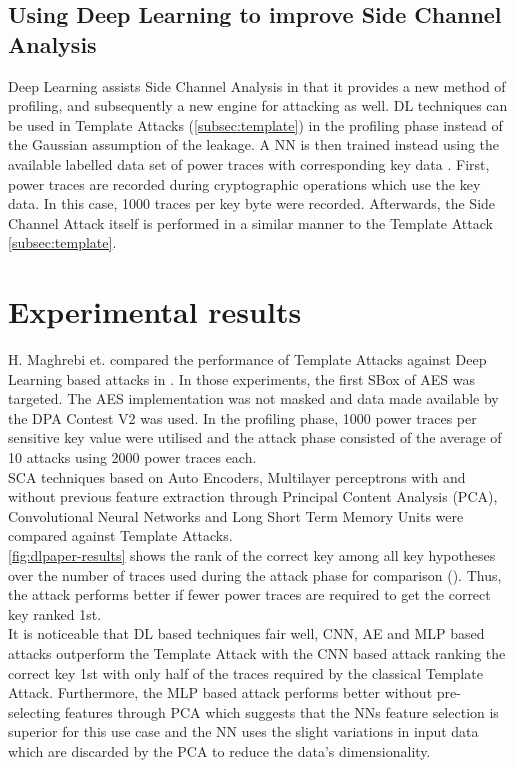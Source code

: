 \documentclass[journal]{IEEEtran}
\begin{document}
\subsection{Using Deep Learning to improve Side Channel Analysis}
Deep Learning assists Side Channel Analysis in that it provides a new method of profiling, and subsequently a new engine for attacking as well. DL techniques can be used in Template Attacks (\autoref{subsec:template}) in the profiling phase instead of the Gaussian assumption of the leakage. A NN is then trained instead using the available labelled data set of power traces with corresponding key data \cite{nn-aes:gilmore}. First, power traces are recorded during cryptographic operations which use the key data. In this case, 1000 traces per key byte were recorded. Afterwards, the Side Channel Attack itself is performed in a similar manner to the Template Attack \autoref{subsec:template}. 

\section{Experimental results}
H. Maghrebi et. compared the performance of Template Attacks against Deep Learning based attacks in \cite{breaking-crypto-dl:prouff}. In those experiments, the first SBox of AES was targeted. The AES implementation was not masked and data made available by the DPA Contest V2 \cite{dpacv2:web} was used. In the profiling phase, 1000 power traces per sensitive key value were utilised and the attack phase consisted of the average of 10 attacks using 2000 power traces each. \\
SCA techniques based on Auto Encoders, Multilayer perceptrons with and without previous feature extraction through Principal Content Analysis (PCA), Convolutional Neural Networks and Long Short Term Memory Units were compared against Template Attacks. \\ 
\autoref{fig:dlpaper-results} shows the rank of the correct key among all key hypotheses over the number of traces used during the attack phase for comparison (\cite{sca-framework:standaert}). Thus, the attack performs better if fewer power traces are required to get the correct key ranked 1st. \\
It is noticeable that DL based techniques fair well, CNN, AE and MLP based attacks outperform the Template Attack with the CNN based attack ranking the correct key 1st with only half of the traces required by the classical Template Attack. Furthermore, the MLP based attack performs better without pre-selecting features through PCA which suggests that the NNs feature selection is superior for this use case and the NN uses the slight variations in input data which are discarded by the PCA to reduce the data's dimensionality.
\end{document}
